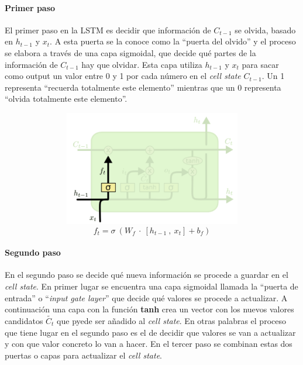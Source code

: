 \documentclass[]{DissertateUSU}
\let\oldparagraph\paragraph
\renewcommand{\paragraph}[1]{\oldparagraph{#1}\mbox{}}
\begin{document}
\setlength\parskip{5ex}
\justifying

\hypertarget{primer-paso}{%
\paragraph{Primer paso}\label{primer-paso}}

\noindent El primer paso en la LSTM es decidir que información de
\(C_{t-1}\) se olvida, basado en \(h_{t-1}\) y \(x_t\). A esta puerta se
la conoce como la ``puerta del olvido'' y el proceso se elabora a través
de una capa sigmoidal, que decide qué partes de la información de
\(C_{t-1}\) hay que olvidar. Esta capa utiliza \(h_{t-1}\) y \(x_t\)
para sacar como output un valor entre 0 y 1 por cada número en el
\emph{cell state} \(C_{t-1}\). Un 1 representa ``recuerda totalmente
este elemento'' mientras que un 0 representa ``olvida totalmente este
elemento''.

\centering

\includegraphics[width=6.25in,height=1.97917in]{firststeplstm.png}
\[f_t=\sigma \ (W_f \ \cdot \ [h_{t-1} \ , \ x_t] + b_f)\] \centering
{}

\setlength\parskip{5ex}
\justifying

\hypertarget{segundo-paso}{%
\paragraph{Segundo paso}\label{segundo-paso}}

\noindent En el segundo paso se decide qué nueva información se procede
a guardar en el \emph{cell state}. En primer lugar se encuentra una capa
sigmoidal llamada la ``puerta de entrada'' o ``\emph{input gate layer}''
que decide qué valores se procede a actualizar. A continuación una capa
con la función \textbf{tanh} crea un vector con los nuevos valores
candidatos \(\tilde{C_{t}}\) que pyede ser añadido al \emph{cell state}.
En otras palabras el proceso que tiene lugar en el segundo paso es el de
decidir que valores se van a actualizar y con que valor concreto lo van
a hacer. En el tercer paso se combinan estas dos puertas o capas para
actualizar el \emph{cell state}.
\end{document}
